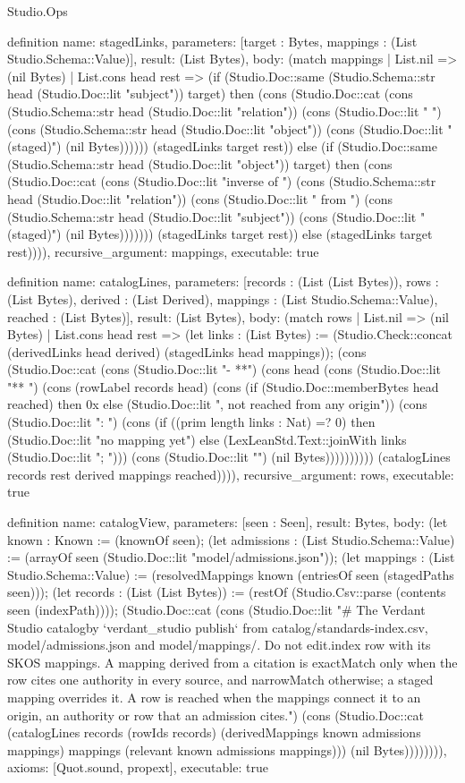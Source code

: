 \begin{lexlean}{Studio.Ops}
\begin{semanticmodule}
{definition{
  name: stagedLinks,
  parameters: [target : Bytes, mappings : (List Studio.Schema::Value)],
  result: (List Bytes),
  body: (match mappings
    | List.nil => (nil Bytes)
    | List.cons head rest => (if (Studio.Doc::same (Studio.Schema::str head (Studio.Doc::lit "subject")) target) then (cons (Studio.Doc::cat (cons (Studio.Schema::str head (Studio.Doc::lit "relation")) (cons (Studio.Doc::lit " ") (cons (Studio.Schema::str head (Studio.Doc::lit "object")) (cons (Studio.Doc::lit " (staged)") (nil Bytes)))))) (stagedLinks target rest)) else (if (Studio.Doc::same (Studio.Schema::str head (Studio.Doc::lit "object")) target) then (cons (Studio.Doc::cat (cons (Studio.Doc::lit "inverse of ") (cons (Studio.Schema::str head (Studio.Doc::lit "relation")) (cons (Studio.Doc::lit " from ") (cons (Studio.Schema::str head (Studio.Doc::lit "subject")) (cons (Studio.Doc::lit " (staged)") (nil Bytes))))))) (stagedLinks target rest)) else (stagedLinks target rest)))),
  recursive_argument: mappings,
  executable: true
}

definition{
  name: catalogLines,
  parameters: [records : (List (List Bytes)), rows : (List Bytes), derived : (List Derived), mappings : (List Studio.Schema::Value), reached : (List Bytes)],
  result: (List Bytes),
  body: (match rows
    | List.nil => (nil Bytes)
    | List.cons head rest => (let links : (List Bytes) := (Studio.Check::concat (derivedLinks head derived) (stagedLinks head mappings)); (cons (Studio.Doc::cat (cons (Studio.Doc::lit "- **") (cons head (cons (Studio.Doc::lit "** ") (cons (rowLabel records head) (cons (if (Studio.Doc::memberBytes head reached) then 0x else (Studio.Doc::lit ", not reached from any origin")) (cons (Studio.Doc::lit ": ") (cons (if ((prim length links : Nat) =? 0) then (Studio.Doc::lit "no mapping yet") else (LexLeanStd.Text::joinWith links (Studio.Doc::lit "; "))) (cons (Studio.Doc::lit "\n") (nil Bytes)))))))))) (catalogLines records rest derived mappings reached)))),
  recursive_argument: rows,
  executable: true
}

definition{
  name: catalogView,
  parameters: [seen : Seen],
  result: Bytes,
  body: (let known : Known := (knownOf seen); (let admissions : (List Studio.Schema::Value) := (arrayOf seen (Studio.Doc::lit "model/admissions.json")); (let mappings : (List Studio.Schema::Value) := (resolvedMappings known (entriesOf seen (stagedPaths seen))); (let records : (List (List Bytes)) := (restOf (Studio.Csv::parse (contents seen (indexPath)))); (Studio.Doc::cat (cons (Studio.Doc::lit "# The Verdant Studio catalog\n\nGenerated by `verdant_studio publish` from catalog/standards-index.csv, model/admissions.json and model/mappings/. Do not edit.\nEach index row with its SKOS mappings. A mapping derived from a citation is exactMatch only when the row cites one authority in every source, and narrowMatch otherwise; a staged mapping overrides it. A row is reached when the mappings connect it to an origin, an authority or row that an admission cites.\n\n") (cons (Studio.Doc::cat (catalogLines records (rowIds records) (derivedMappings known admissions mappings) mappings (relevant known admissions mappings))) (nil Bytes)))))))),
  axioms: [Quot.sound, propext],
  executable: true
}

}
\end{semanticmodule}
\end{lexlean}
